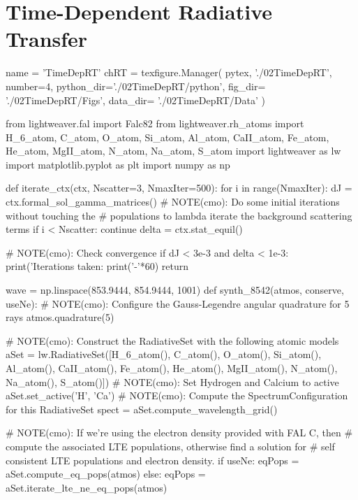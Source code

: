 \chapter{Time-Dependent Radiative Transfer}

\begin{pycode}[TimeDepRT]
name = 'TimeDepRT'
chRT = texfigure.Manager(
    pytex,
    './02TimeDepRT',
    number=4,
    python_dir='./02TimeDepRT/python',
    fig_dir=   './02TimeDepRT/Figs',
    data_dir=  './02TimeDepRT/Data'
)
\end{pycode}

\begin{pycode}[TimeDepRT]
from lightweaver.fal import Falc82
from lightweaver.rh_atoms import H_6_atom, C_atom, O_atom, Si_atom, Al_atom, CaII_atom, Fe_atom, He_atom, MgII_atom, N_atom, Na_atom, S_atom
import lightweaver as lw
import matplotlib.pyplot as plt
import numpy as np

def iterate_ctx(ctx, Nscatter=3, NmaxIter=500):
    for i in range(NmaxIter):
        dJ = ctx.formal_sol_gamma_matrices()
        # NOTE(cmo): Do some initial iterations without touching the
        # populations to lambda iterate the background scattering terms
        if i < Nscatter:
            continue
        delta = ctx.stat_equil()

        # NOTE(cmo): Check convergence
        if dJ < 3e-3 and delta < 1e-3:
            print('Iterations taken: %
            print('-'*60)
            return

wave = np.linspace(853.9444, 854.9444, 1001)
def synth_8542(atmos, conserve, useNe):
    # NOTE(cmo): Configure the Gauss-Legendre angular quadrature for 5 rays
    atmos.quadrature(5)

    # NOTE(cmo): Construct the RadiativeSet with the following atomic models
    aSet = lw.RadiativeSet([H_6_atom(), C_atom(), O_atom(), Si_atom(), Al_atom(), CaII_atom(),
                            Fe_atom(), He_atom(), MgII_atom(), N_atom(), Na_atom(), S_atom()])
    # NOTE(cmo): Set Hydrogen and Calcium to active
    aSet.set_active('H', 'Ca')
    # NOTE(cmo): Compute the SpectrumConfiguration for this RadiativeSet
    spect = aSet.compute_wavelength_grid()

    # NOTE(cmo): If we're using the electron density provided with FAL C, then
    # compute the associated LTE populations, otherwise find a solution for
    # self consistent LTE populations and electron density.
    if useNe:
        eqPops = aSet.compute_eq_pops(atmos)
    else:
        eqPops = aSet.iterate_lte_ne_eq_pops(atmos)


\end{pycode}
